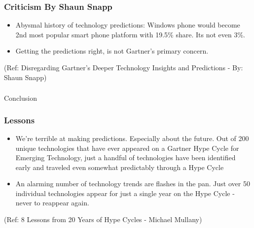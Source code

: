 \begin{frame}[fragile]\frametitle{Criticism By Shaun Snapp}


\begin{itemize}
\item Abysmal history of technology predictions: Windows phone would become 2nd most popular smart phone platform with 19.5\% share. Its not even 3\%.
\item Getting the predictions right, is not Gartner's primary concern.

\end{itemize}

{\tiny (Ref: Disregarding Gartner's Deeper Technology Insights and Predictions - By: Shaun Snapp)}

\end{frame}


\begin{frame}[fragile]\frametitle{}
\begin{center}
{\Large Conclusion}
\end{center}
\end{frame}

\begin{frame}[fragile]\frametitle{Lessons}


\begin{itemize}
\item  We're terrible at making predictions. Especially about the future. Out of 200 unique technologies that have ever appeared on a Gartner Hype Cycle for Emerging Technology, just a handful of technologies  have been identified early and traveled even somewhat predictably through a Hype Cycle
\item An alarming number of technology trends are flashes in the pan. Just over 50 individual technologies appear for just a single year on the Hype Cycle - never to reappear again. 
\end{itemize}


{\tiny (Ref: 8 Lessons from 20 Years of Hype Cycles - Michael Mullany)}

\end{frame}

